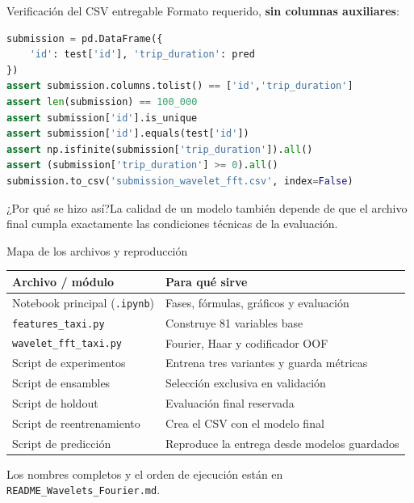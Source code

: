 \documentclass[aspectratio=169,11pt]{beamer}
\newcommand{\porq}[1]{\vspace{1.2mm}\begin{block}{¿Por qué se hizo así?}\small #1\end{block}}
\begin{document}
\begin{frame}[fragile]{Verificación del CSV entregable}
\small
Formato requerido, \textbf{sin columnas auxiliares}:
\begin{lstlisting}[language=Python,basicstyle=\ttfamily\scriptsize]
submission = pd.DataFrame({
    'id': test['id'], 'trip_duration': pred
})
assert submission.columns.tolist() == ['id','trip_duration']
assert len(submission) == 100_000
assert submission['id'].is_unique
assert submission['id'].equals(test['id'])
assert np.isfinite(submission['trip_duration']).all()
assert (submission['trip_duration'] >= 0).all()
submission.to_csv('submission_wavelet_fft.csv', index=False)
\end{lstlisting}
\porq{La calidad de un modelo también depende de que el archivo final cumpla exactamente las condiciones técnicas de la evaluación.}
\end{frame}

\begin{frame}{Mapa de los archivos y reproducción}
\small
\begin{tabular}{p{}p{}}
\toprule
\textbf{Archivo / módulo} & \textbf{Para qué sirve}\\
\midrule
Notebook principal (\texttt{.ipynb}) & Fases, fórmulas, gráficos y evaluación\\
\texttt{features\_taxi.py} & Construye 81 variables base\\
\texttt{wavelet\_fft\_taxi.py} & Fourier, Haar y codificador OOF\\
Script de experimentos & Entrena tres variantes y guarda métricas\\
Script de ensambles & Selección exclusiva en validación\\
Script de holdout & Evaluación final reservada\\
Script de reentrenamiento & Crea el CSV con el modelo final\\
Script de predicción & Reproduce la entrega desde modelos guardados\\
\bottomrule
\end{tabular}
\vspace{2mm}
{\scriptsize Los nombres completos y el orden de ejecución están en \texttt{README\_Wavelets\_Fourier.md}.}
\end{frame}
\end{document}
